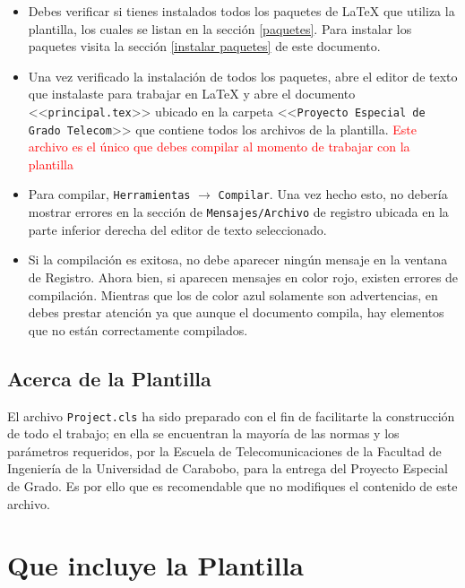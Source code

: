 \begin{itemize}

\item Debes verificar si tienes instalados todos los paquetes de LaTeX que utiliza la plantilla, los cuales se listan en la sección \ref{paquetes}. Para instalar los paquetes visita la sección \ref{instalar paquetes} de este documento.
\item Una vez verificado la instalación de todos los paquetes, abre el editor de texto que instalaste para trabajar en LaTeX y abre el documento <<\texttt{principal.tex}>> ubicado en la carpeta <<\texttt{Proyecto Especial de Grado Telecom}>> que contiene todos los archivos de la plantilla. \textcolor{red}{Este archivo es el único que debes compilar al momento de trabajar con la plantilla}
\item Para compilar, \texttt{Herramientas} $\rightarrow$ \texttt{Compilar}. Una vez hecho esto, no debería mostrar errores en la sección de \texttt{Mensajes/Archivo} de registro ubicada en la parte inferior derecha del editor de texto seleccionado.
\item Si la compilación es exitosa, no debe aparecer ningún mensaje en la ventana de Registro. Ahora bien, si aparecen mensajes en color rojo, existen errores de compilación. Mientras que los de color azul solamente son advertencias, en debes prestar atención ya que aunque el documento compila, hay elementos que no están correctamente compilados.

\end{itemize}

\subsection{Acerca de la Plantilla}

El archivo \texttt{Project.cls} ha sido preparado con el fin de facilitarte la construcci\'{o}n de todo el trabajo; en ella se encuentran la mayoría de las normas y los par\'{a}metros requeridos, por la Escuela de Telecomunicaciones de la Facultad de Ingenier\'{i}a de la Universidad de Carabobo, para la entrega del Proyecto Especial de Grado. Es por ello que es recomendable que no modifiques el contenido de este archivo.


\section{Que incluye la Plantilla}

